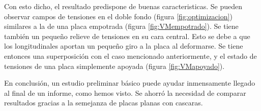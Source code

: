 \documentclass[onecolumn,10pt,titlepage]{article}
\begin{document}
Con esto dicho, el resultado predispone de buenas caracteristicas. Se pueden observar campos de tensiones en el doble fondo (figura \ref{fig:optimizacion}) similares a la de una placa empotrada (figura \ref{fig:VMempotrado}). Se tiene también un pequeño relieve de tensiones en su cara central. Esto se debe a que los longitudinales aportan un pequeño giro a la placa al deformarse. Se tiene entonces una superposición con el caso mencionado anteriormente, y el estado de tensiones de una placa simplemente apoyada (figura \ref{fig:VMapoyado}).

En conclusión, un estudio preliminar básico puede ayudar inmensamente llegado al final de un informe, como hemos visto. Se ahorró la necesidad de comparar resultados gracias a la semejanza de placas planas con cascaras.



\clearpage
 
\end{document}
